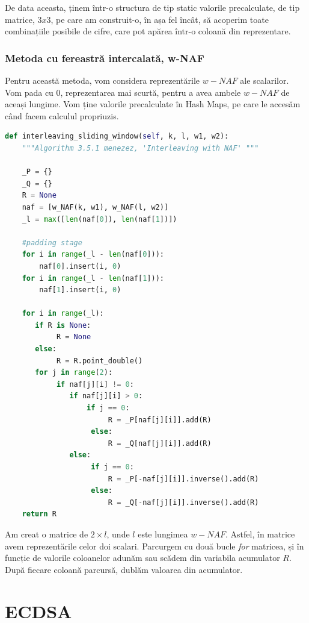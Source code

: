 De data aceasta, ținem într-o structura de tip static valorile precalculate, de tip matrice, $3x3$, pe care am construit-o, în așa fel încât, să acoperim toate combinațiile posibile de cifre, care pot apărea într-o coloană din reprezentare.

\subsubsection{Metoda cu fereastră intercalată, w-NAF}

Pentru această metoda, vom considera reprezentările $w-NAF$ ale scalarilor. Vom pada cu 0, reprezentarea mai scurtă, pentru a avea ambele $w-NAF$ de aceași lungime. Vom ține valorile precalculate în Hash Maps, pe care le accesăm când facem calculul propriuzis.

\begin{lstlisting}[language=Python]
def interleaving_sliding_window(self, k, l, w1, w2):
    """Algorithm 3.5.1 menezez, 'Interleaving with NAF' """

    _P = {}
    _Q = {}
    R = None
    naf = [w_NAF(k, w1), w_NAF(l, w2)]
    _l = max([len(naf[0]), len(naf[1])])
    
    #padding stage
    for i in range(_l - len(naf[0])):
        naf[0].insert(i, 0)
    for i in range(_l - len(naf[1])):
        naf[1].insert(i, 0)

    for i in range(_l):
       if R is None:
            R = None
       else:
            R = R.point_double()
       for j in range(2):
            if naf[j][i] != 0:
               if naf[j][i] > 0:
                   if j == 0:
                        R = _P[naf[j][i]].add(R)
                    else:
                        R = _Q[naf[j][i]].add(R)
               else:
                    if j == 0:
                        R = _P[-naf[j][i]].inverse().add(R)
                    else:
                        R = _Q[-naf[j][i]].inverse().add(R)
    return R

\end{lstlisting}

Am creat o matrice de $2\times l$, unde $l$ este lungimea $w-NAF$. Astfel, în matrice avem reprezentările celor doi scalari. Parcurgem cu două bucle \textit{for} matricea, și în funcție de valorile coloanelor adunăm sau scădem din variabila acumulator $R$. După fiecare coloană parcursă, dublăm valoarea din acumulator.

\section{ECDSA}

